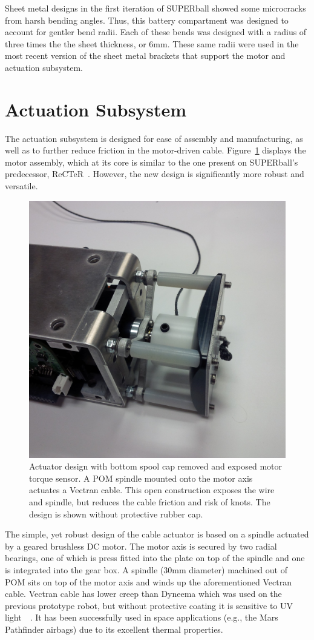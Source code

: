 \documentclass[12pt]{report}
\begin{document}
Sheet metal designs in the first iteration of SUPERball showed some microcracks from harsh bending angles.
Thus, this battery compartment was designed to account for gentler bend radii.
Each of these bends was designed with a radius of three times the the sheet thickness, or 6mm.
These same radii were used in the most recent version of the sheet metal brackets that support the motor and actuation subsystem.

\section{Actuation Subsystem}
The actuation subsystem is designed for ease of assembly and manufacturing, as well as to further reduce friction in the motor-driven cable.
Figure~\ref{actuation_open_view} displays the motor assembly, 
which at its core is similar to the one present on SUPERball's predecessor, ReCTeR~\cite{Caluwaerts2013rsif}.
However, the new design is significantly more robust and versatile.

\begin{figure}
   \centering
   \includegraphics[width=0.33\columnwidth]{img/actuation.jpg} 
   \caption{Actuator design with bottom spool cap removed and exposed motor torque sensor. 
A POM spindle mounted onto the motor axis actuates a Vectran cable. 
This open construction exposes the wire and spindle, but reduces the cable friction and risk of knots.
The design is shown without protective rubber cap.}
   \label{actuation_open_view}
\end{figure}

The simple, yet robust design of the cable actuator is based on a spindle actuated by a geared brushless DC motor.
The motor axis is secured by two radial bearings, one  of which is press fitted into the plate on top of the spindle and one is integrated into the gear box.
A spindle (30mm diameter) machined out of POM sits on top of the motor axis and winds up the aforementioned Vectran cable.
Vectran cable has lower creep than Dyneema which was used on the previous prototype robot, 
but without protective coating it is sensitive to UV light~\cite{fette2004vectran}~\cite{said2006investigation}.
It has been successfully used in space applications (e.g., the Mars Pathfinder airbags) due to its excellent thermal properties.
\end{document}
